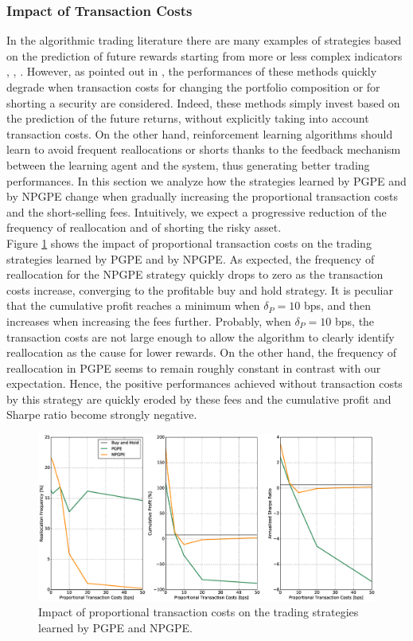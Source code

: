 \subsubsection{Impact of Transaction Costs}
In the algorithmic trading literature there are many examples of strategies based on the prediction of future rewards starting from more or less complex indicators \cite{kamijo1990stock}, \cite{saad1998comparative}, \cite{liang2011stock}. However, as pointed out in \cite{deng2016deep}, the performances of these methods quickly degrade when transaction costs for changing the portfolio composition or for shorting a security
are considered. Indeed, these methods simply invest based on the prediction of the future returns, without explicitly taking into account transaction costs. On the other hand, reinforcement learning algorithms should learn to avoid frequent reallocations or shorts thanks to the feedback mechanism between the learning agent and the system, thus generating better trading performances. In this section we analyze how the strategies learned by PGPE and by NPGPE change when gradually increasing the proportional transaction costs and the short-selling fees. Intuitively, we expect a progressive reduction of the frequency of reallocation and of shorting the risky asset.\\
Figure \ref{fig:impact_transaction_costs} shows the impact of proportional transaction costs on the trading strategies learned by PGPE and by NPGPE. As expected, the frequency of reallocation for the NPGPE strategy quickly drops to zero as the transaction costs increase, converging to the profitable buy and hold strategy. It is peculiar that the cumulative profit reaches a minimum when $\delta_P = 10$ bps, and then increases when increasing the fees further. Probably, when $\delta_P = 10$ bps, the transaction costs are not large enough to allow the algorithm to clearly identify reallocation as the cause for lower rewards. On the other hand, the frequency of reallocation in PGPE seems to remain roughly constant in contrast with our expectation. Hence, the positive performances achieved without transaction costs by this strategy are quickly eroded by these fees and the cumulative profit and Sharpe ratio become strongly negative.\\
\begin{figure}[t!]
	\centering
	\includegraphics[width=1.0\textwidth]{Images/6_2_impact_transaction_costs}
	\caption[Impact of proportional transaction costs]{Impact of proportional transaction costs on the trading strategies learned by PGPE and NPGPE.}
	\label{fig:impact_transaction_costs}
\end{figure}
